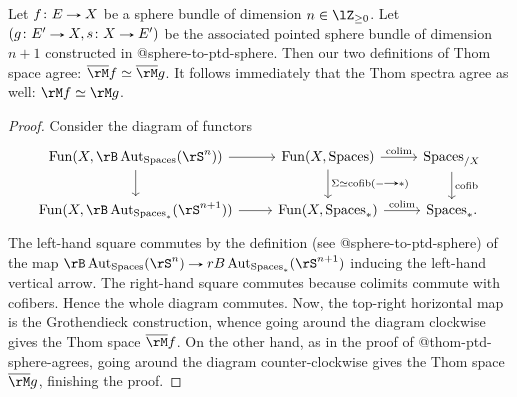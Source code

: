 \begin{lemma}
  \label{thom-sphere-agrees}
  Let $f \c E \to X$ be a sphere bundle of dimension $n \in \lZ_{\ge 0}$. Let $(g \c E' \to X, s \c X \to E')$ be the associated pointed sphere bundle of dimension $n+1$ constructed in @sphere-to-ptd-sphere. Then our two definitions of Thom space agree: $\o\rM f \iso \o\rM g$. It follows immediately that the Thom spectra agree as well: $\rM f \iso \rM g$.
\end{lemma}

\begin{proof}
  Consider the diagram of functors
  \[
    \begin{tikzcd}
      \Fun(X, \rB\Aut_{\Spaces}(\rS^n)) \ar[d] \ar[r] &
      \Fun(X, \Spaces) \ar[d, "\Sigma \iso \cofib(- \to *)"] \ar[r, "\colim"] &
      \Spaces_{/X} \ar[d, "\cofib"] \\
      \Fun(X, \rB\Aut_{\Spaces_*}(\rS^{n+1})) \ar[r] &
      \Fun(X, \Spaces_*) \ar[r, "\colim"] &
      \Spaces_*.
    \end{tikzcd}
  \]
  The left-hand square commutes by the definition (see @sphere-to-ptd-sphere) of the map $\rB\Aut_{\Spaces}(\rS^n) \to rB\Aut_{\Spaces_*}(\rS^{n+1})$ inducing the left-hand vertical arrow. The right-hand square commutes because colimits commute with cofibers. Hence the whole diagram commutes. Now, the top-right horizontal map is the Grothendieck construction, whence going around the diagram clockwise gives the Thom space $\o\rM f$. On the other hand, as in the proof of @thom-ptd-sphere-agrees, going around the diagram counter-clockwise gives the Thom space $\o\rM g$, finishing the proof.
\end{proof}

% 
% 



